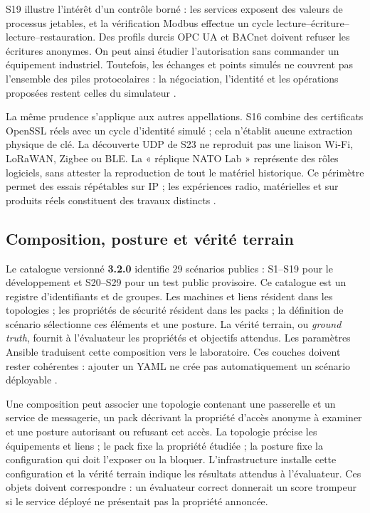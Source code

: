 \documentclass[11pt,a4paper]{article}
\begin{document}
S19 illustre l'intérêt d'un contrôle borné : les services exposent des valeurs
de processus jetables, et la vérification Modbus effectue un cycle
lecture--écriture--lecture--restauration. Des profils durcis OPC UA et BACnet
doivent refuser les écritures anonymes. On peut ainsi étudier l'autorisation
sans commander un équipement industriel. Toutefois, les échanges et points
simulés ne couvrent pas l'ensemble des piles protocolaires : la négociation,
l'identité et les opérations proposées restent celles du simulateur
\cite{net-ot,net-verify}.

La même prudence s'applique aux autres appellations. S16 combine des certificats
OpenSSL réels avec un cycle d'identité simulé ; cela n'établit aucune extraction
physique de clé. La découverte UDP de S23 ne reproduit pas une liaison Wi-Fi,
LoRaWAN, Zigbee ou BLE. La « réplique NATO Lab » représente des rôles logiciels,
sans attester la reproduction de tout le matériel historique. Ce périmètre
permet des essais répétables sur IP ; les expériences radio, matérielles et
sur produits réels constituent des travaux distincts \cite{net-attacks}.

\subsection{Composition, posture et vérité terrain}

Le catalogue versionné \textbf{3.2.0} identifie 29 scénarios publics : S1--S19
pour le développement et S20--S29 pour un test public provisoire. Ce catalogue
est un registre d'identifiants et de groupes. Les machines et liens résident
dans les topologies ; les propriétés de sécurité résident dans les packs ; la
définition de scénario sélectionne ces éléments et une posture. La vérité
terrain, ou \emph{ground truth}, fournit à l'évaluateur les propriétés et
objectifs attendus. Les paramètres Ansible traduisent cette composition vers
le laboratoire. Ces couches doivent rester cohérentes : ajouter un YAML ne
crée pas automatiquement un scénario déployable \cite{net-catalog,net-scenarios}.

Une composition peut associer une topologie contenant une passerelle et un
service de messagerie, un pack décrivant la propriété d'accès anonyme à examiner
et une posture autorisant ou refusant cet accès. La topologie précise les
équipements et liens ; le pack fixe la propriété étudiée ; la posture fixe la
configuration qui doit l'exposer ou la bloquer. L'infrastructure installe cette
configuration et la vérité terrain indique les résultats attendus à
l'évaluateur. Ces objets doivent correspondre : un évaluateur correct donnerait
un score trompeur si le service déployé ne présentait pas la propriété annoncée.
\end{document}
